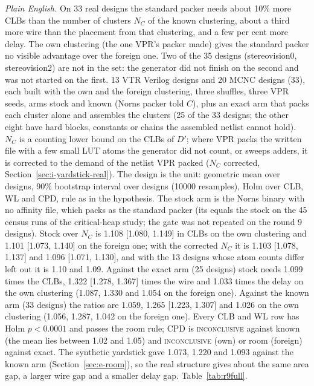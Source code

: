  \emph{Plain English.} On 33 real designs the standard packer needs about 10\% more CLBs than the number of clusters $N_C$ of the known clustering, about a third more wire than the placement from that clustering, and a few per cent more delay. The own clustering (the one VPR's packer made) gives the standard packer no visible advantage over the foreign one. Two of the 35 designs (stereovision0, stereovision2) are not in the set: the generator did not finish on the second and was not started on the first.
 13 VTR Verilog designs and 20 MCNC designs (33), each built with the own and the foreign clustering, three shuffles, three VPR seeds, arms stock and known (Norns packer told $C$), plus an exact arm that packs each cluster alone and assembles the clusters (25 of the 33 designs; the other eight have hard blocks, constants or chains the assembled netlist cannot hold). $N_C$ is a counting lower bound on the CLBs of $D'$; where VPR packs the written file with a few small LUT atoms the generator did not count, or sweeps adders, it is corrected to the demand of the netlist VPR packed ($N_C$ corrected, Section~\ref{sec:i-yardstick-real}). The design is the unit: geometric mean over designs, 90\% bootstrap interval over designs (10000 resamples), Holm over CLB, WL and CPD, rule as in the hypothesis. The stock arm is the Norns binary with no affinity file, which packs as the standard packer (its  equals the stock  on the 45 census runs of the critical-heap study; the gate was not repeated on the round 9 designs).
 Stock over $N_C$ is 1.108 [1.080, 1.149] in CLBs on the own clustering and 1.101 [1.073, 1.140] on the foreign one; with the corrected $N_C$ it is 1.103 [1.078, 1.137] and 1.096 [1.071, 1.130], and with the 13 designs whose atom counts differ left out it is 1.10 and 1.09. Against the exact arm (25 designs) stock needs 1.099 times the CLBs, 1.322 [1.278, 1.367] times the wire and 1.033 times the delay on the own clustering (1.087, 1.330 and 1.054 on the foreign one). Against the known arm (33 designs) the ratios are 1.059, 1.265 [1.223, 1.307] and 1.026 on the own clustering (1.056, 1.287, 1.042 on the foreign one). Every CLB and WL row has Holm $p<0.0001$ and passes the room rule; CPD is \textsc{inconclusive} against known (the mean lies between 1.02 and 1.05) and \textsc{inconclusive} (own) or room (foreign) against exact. The synthetic yardstick gave 1.073, 1.220 and 1.093 against the known arm (Section~\ref{sec:e-room}), so the real structure gives about the same area gap, a larger wire gap and a smaller delay gap. Table~\ref{tab:r9full}.
